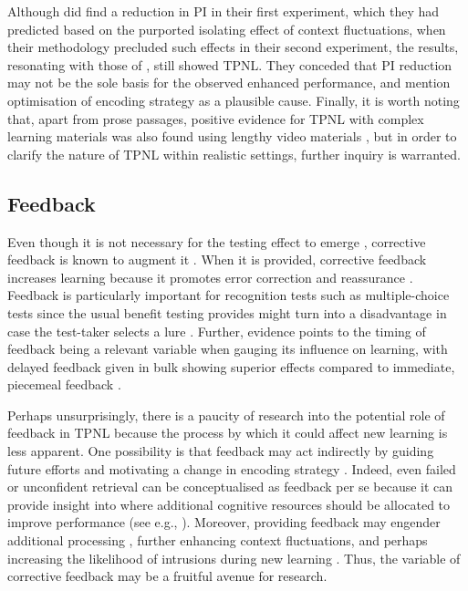 \documentclass[../main.tex]{subfiles}
\begin{document}
Although \cite{divisRetrievalSpeedsContext2014} did find a reduction in PI 
in their first experiment, which they had predicted based on the purported 
isolating effect of context fluctuations, when their methodology precluded 
such effects in their second experiment, the results, resonating with those 
of \cite{wissmanInterimTestEffect2011}, still showed TPNL. They conceded 
that PI reduction may not be the sole basis for the observed enhanced 
performance, and mention optimisation of encoding strategy as a plausible 
cause. Finally, it is worth noting that, apart from prose passages, positive 
evidence for TPNL with complex learning materials was also found using 
lengthy video materials \citep{szpunarInterpolatedMemoryTests2013, 
jingInterpolatedTestingInfluences2016, chanRecallingWitnessedEvent2009}, but 
in order to clarify the nature of TPNL within realistic settings, further 
inquiry is warranted.

\hypertarget{feedback}{%
\subsection{Feedback}}

Even though it is not necessary for the testing 
effect to emerge 
\citep{roedigeriiiTestEnhancedLearningTaking2006}, 
corrective feedback is 
known to augment it 
\citep{roedigeriiiCriticalRoleRetrieval2011}. When it 
is 
provided, corrective feedback increases learning 
because it promotes error 
correction \citep{pashlerWhenDoesFeedback2005} and 
reassurance 
\citep{butlerCorrectingMetacognitiveError2008}. 
Feedback is particularly 
important for recognition tests such as 
multiple-choice tests since the 
usual benefit testing provides might turn into a 
disadvantage in case the 
test-taker selects a lure 
\citep{roedigeriiiPositiveNegativeConsequences2005, 
	marshMemorialConsequencesMultiplechoice2007}. 
	Further, evidence points 
	to the timing of feedback being a relevant 
	variable when gauging its 
	influence on learning, with delayed feedback 
	given in bulk showing 
	superior effects compared to immediate, piecemeal 
	feedback 
\citep{metcalfeDelayedImmediateFeedback2009,butlerEffectTypeTiming2007,
	butlerFeedbackEnhancesPositive2008,smithLearningFeedbackSpacing2010}.

Perhaps unsurprisingly, there is a paucity of 
research into the potential 
role of feedback in TPNL because the process by 
which it could affect new 
learning is less apparent. One possibility is that 
feedback may act 
indirectly by guiding future efforts and motivating 
a change in encoding 
strategy \citep{roedigeriiiPowerTestingMemory2006}. 
Indeed, even failed or 
unconfident retrieval can be conceptualised as 
feedback per se because it 
can provide insight into where additional cognitive 
resources should be 
allocated to improve performance (see e.g., 
\citealp{kornellUnsuccessfulRetrievalAttempts2009}). 
Moreover, providing 
feedback may engender additional processing 
\citep{bangert-drownsInstructionalEffectFeedback1991},
 further enhancing 
context fluctuations, and perhaps increasing the 
likelihood of intrusions 
during new learning 
\citep{chanRetrievalPotentiatesNew2018}. Thus, the 
variable of corrective feedback may be a fruitful 
avenue for research.
\end{document}
